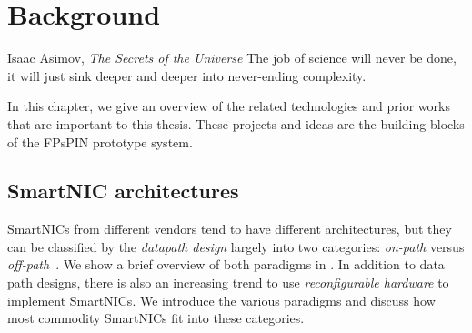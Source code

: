 \chapter{Background}
\begin{chapquote}{Isaac Asimov, \textit{The Secrets of the Universe}}
The job of science will never be done, it will just sink deeper and deeper into never-ending complexity.
\end{chapquote}

In this chapter, we give an overview of the related technologies and prior works that are important to this thesis.  These projects and ideas are the building blocks of the FPsPIN prototype system.

\section{SmartNIC architectures}
SmartNICs from different vendors tend to have different architectures, but they can be classified by the \emph{datapath design} largely into two categories: \emph{on-path} versus \emph{off-path}~\cite{liu_offloading_2019, wei_characterizing_2023}.  We show a brief overview of both paradigms in .  In addition to data path designs, there is also an increasing trend to use \emph{reconfigurable hardware} to implement SmartNICs.  We introduce the various paradigms and discuss how most commodity SmartNICs fit into these categories.

